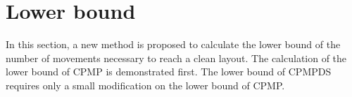 \documentclass[review,3p,times,authoryear,12pt]{elsarticle}
\newtheorem{theorem}{Theorem}
\begin{document}


\section{Lower bound}
\label{sec:cf}

In this section, a new method is proposed to calculate the lower bound of the number of movements necessary to reach a clean layout. The calculation of the lower bound of CPMP is demonstrated first. The lower bound of CPMPDS requires only a small modification on the lower bound of CPMP.

%
%
%
\end{document}
